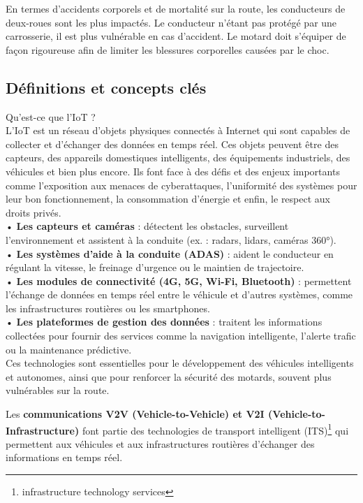 \documentclass{article}
\begin{document}
En termes d’accidents corporels et de mortalité sur la route, les conducteurs de deux-roues sont les plus impactés. Le conducteur n’étant pas protégé par une carrosserie, il est plus vulnérable en cas d’accident. Le motard doit s’équiper de façon rigoureuse afin de limiter les blessures corporelles causées par le choc.


\subsection{Définitions et concepts clés}
Qu'est-ce que l'IoT ?\\
L'IoT est un réseau d’objets physiques connectés à Internet qui sont capables de collecter et d’échanger des données en temps réel. Ces objets peuvent être des capteurs, des appareils domestiques intelligents, des équipements industriels, des véhicules et bien plus encore. Ils font face à des défis et des enjeux importants comme l'exposition aux menaces de cyberattaques, l'uniformité des systèmes pour leur bon fonctionnement, la consommation d'énergie et enfin, le respect aux droits privés. \\
• \textbf{Les capteurs et caméras} : détectent les obstacles, surveillent l’environnement et assistent à la conduite (ex. : radars, lidars, caméras 360°).\\
• \textbf{Les systèmes d’aide à la conduite (ADAS)} : aident le conducteur en régulant la vitesse, le freinage d’urgence ou le maintien de trajectoire.\\
• \textbf{Les modules de connectivité (4G, 5G, Wi-Fi, Bluetooth)} : permettent l’échange de données en temps réel entre le véhicule et d’autres systèmes, comme les infrastructures routières ou les smartphones.\\
• \textbf{Les plateformes de gestion des données} : traitent les informations collectées pour fournir des services comme la navigation intelligente, l’alerte trafic ou la maintenance prédictive.\\
Ces technologies sont essentielles pour le développement des véhicules intelligents et autonomes, ainsi que pour renforcer la sécurité des motards, souvent plus vulnérables sur la route.\\
\vspace{0.5cm}

Les \textbf{communications V2V (Vehicle-to-Vehicle) et V2I (Vehicle-to-Infrastructure)} font partie des technologies de transport intelligent (ITS)\footnote{infrastructure technology services} qui permettent aux véhicules et aux infrastructures routières d’échanger des informations en temps réel.
\end{document}
